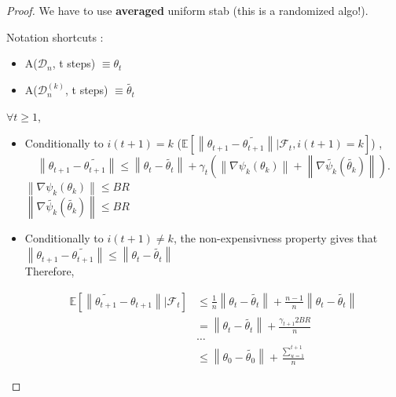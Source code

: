 \begin{proof}
    We have to use \textbf{averaged} uniform stab (this is a randomized algo!).
    
    Notation shortcuts : \begin{itemize}
        \item A($\mathcal{D}_n$, t steps) $\equiv \theta_t$
        \item A($\mathcal{D}_n^{(k)}$, t steps) $\equiv \tilde{\theta_t}$
    \end{itemize}
    
    $\forall t \geq 1$,
    
    \begin{itemize}
        \item Conditionally to $i(t+1) = k$ ($\mathbb{E}[ \left\| \theta_{t+1} - \tilde{\theta_{t+1}} \right\| | \mathcal{F}_t, i(t+1)= k]$) , 
        \[
            \left\| \theta_{t+1} - \tilde{\theta_{t+1}} \right\| \leq \left\| \theta_{t} - \tilde{\theta_{t}} \right\| + \gamma _t ( \left\| \nabla \psi_k (\theta _k) \right\| + \left\| \nabla \tilde{\psi_k} (\tilde{\theta _k}) \right\|)
        .\]
        $\left\| \nabla \psi_k (\theta _k) \right\| \leq BR$ \\
        $\left\| \nabla \tilde{\psi_k} (\tilde{\theta _k}) \right\| \leq BR$

        \item Conditionally to $i(t+1) \neq  k$, the non-expensivness property gives that $\left\|  \theta_{t+1} - \tilde{\theta_{t+1}} \right\| \leq \left\|  \theta_{t} - \tilde{\theta_{t}} \right\|$ \\
        Therefore,
        
        \begin{align*}
            \mathbb{E}[ \left\| \tilde{\theta_{t+1}} - \theta_{t+1} \right\| | \mathcal{F}_t] &\leq \frac{1}{n} \left\| \theta_{t} - \tilde{\theta_{t}} \right\| + \frac{n-1}{n} \left\| \theta_{t} - \tilde{\theta_{t}} \right\| \\
            & = \left\| \theta_{t} - \tilde{\theta_{t}} \right\| + \frac{\gamma _ {t+1} 2BR}{n} \\
            & \dots \\
            & \leq \left\| \theta_0 - \tilde{\theta _0} \right\|  + \frac{\sum_{u=1}^{t+1}}{n}
        \end{align*}
            

\end{itemize}
\end{proof}
